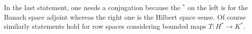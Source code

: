 \documentclass[psamsfonts]{amsart}
\newtheorem{proposition}[theorem]{Proposition}
\newtheorem{remark}[theorem]{Remark}
\newcommand{\la}{\langle}
\newcommand{\ra}{\rangle}
\newcommand{\Linfty}{L_\infty}
\newcommand{\Ltwo}{L_2}
\newcommand{\Hc}{H^c}
\newcommand{\Hr}{H^r}
\begin{document}
 In the last statement, one needs a conjugation because the $^*$ on the left is for the Banach space adjoint whereas the right one is the Hilbert space sense. Of course similarly statements hold for row spaces considering bounded maps $T: H^*\to  K^*$.
\end{document}
